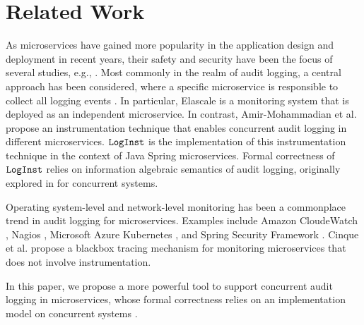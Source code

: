 \section{Related Work} \label{sec:relwork}

As microservices have gained more popularity in the application design and deployment in recent years, their safety and security have been the focus of several studies, e.g., \cite{mateus2021security, nkomo2019software, nehme2019securing, yu2019survey}. Most commonly in the realm of audit logging, a central approach has been considered, where a specific microservice is responsible to collect all logging events \cite{barabanov2021security, kazanavivcius2019migrating}. In particular, Elascale \cite{khazaei2017elascale} is a monitoring system that is deployed as an independent microservice. In contrast, Amir-Mohammadian et al. \cite{stpsa21} propose an instrumentation technique that enables concurrent audit logging in different microservices. $\texttt{LogInst}$ \cite{github1} is the implementation of this instrumentation technique in the context of Java Spring microservices. Formal correctness of $\texttt{LogInst}$ relies on information algebraic \cite{Kohlas14} semantics of audit logging, originally explored in \cite{lsfa20}  for concurrent systems. 

Operating system-level and network-level monitoring  has been a commonplace trend in audit logging for microservices. Examples include Amazon CloudeWatch \cite{cloudwatch}, Nagios \cite{nagios}, Microsoft Azure Kubernetes \cite{kuber}, and Spring Security Framework \cite{nguyen2019applying}. Cinque et al. \cite{cinque2019microservices} propose a blackbox tracing mechanism for monitoring microservices that does not involve instrumentation. 

In this paper, we propose a more powerful tool to support concurrent audit logging in microservices, whose formal correctness relies on an implementation model on concurrent systems \cite{amirmoh-tr21}.


